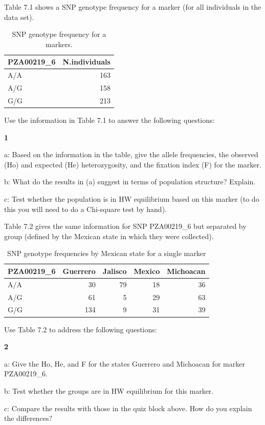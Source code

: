 \documentclass[
]{book}
\makeatletter
\newenvironment{kframe}{%
\medskip{}
\setlength{\fboxsep}{.8em}
 \def\at@end@of@kframe{}%
 \ifinner\ifhmode%
  \def\at@end@of@kframe{\end{minipage}}%
  \begin{minipage}{\columnwidth}%
 \fi\fi%
 \def\FrameCommand##1{\hskip\@totalleftmargin \hskip-\fboxsep
 \colorbox{shadecolor}{##1}\hskip-\fboxsep
     \hskip-\linewidth \hskip-\@totalleftmargin \hskip\columnwidth}%
 \MakeFramed {\advance\hsize-\width
   \@totalleftmargin\z@ \linewidth\hsize
   \@setminipage}}%
 {\par\unskip\endMakeFramed%
 \at@end@of@kframe}
\newenvironment{rmdblock}[1]
  {
  \begin{itemize}
  \renewcommand{\labelitemi}{
    \raisebox{-.7\height}[0pt][0pt]{
      {\setkeys{Gin}{width=3em,keepaspectratio}\texttt{[image: images/\#1]}}
    }
  }
  \setlength{\fboxsep}{1em}
  \begin{kframe}
  \item
  }
  {
  \end{kframe}
  \end{itemize}
  }
\newenvironment{rmdquiz}
  {\begin{rmdblock}{quiz}}
  {\end{rmdblock}}
\makeatother
\begin{document}
Table 7.1 shows a SNP genotype frequency for a marker (for all individuals in the data set).

\begin{table}

\caption{\label{tab:unnamed-chunk-269}SNP genotype frequency for a markers.}
\centering
\begin{tabular}[t]{lr}
\toprule
PZA00219\_6 & N.individuals\\
\midrule
A/A & 163\\
A/G & 158\\
G/G & 213\\
\bottomrule
\end{tabular}
\end{table}

Use the information in Table 7.1 to answer the following questions:

\begin{rmdquiz}
\textbf{1}

a: Based on the information in the table, give the allele frequencies, the observed (Ho) and expected (He) heterozygosity, and the fixation index (F) for the marker.

b: What do the results in (a) suggest in terms of population structure? Explain.

c: Test whether the population is in HW equilibrium based on this marker (to do this you will need to do a Chi-square test by hand).
\end{rmdquiz}

Table 7.2 gives the same information for SNP PZA00219\_6 but separated by group (defined by the Mexican state in which they were collected).

\begin{table}

\caption{\label{tab:unnamed-chunk-271}SNP genotype frequencies by Mexican state for a single marker}
\centering
\begin{tabular}[t]{lrrrr}
\toprule
PZA00219\_6 & Guerrero & Jalisco & Mexico & Michoacan\\
\midrule
A/A & 30 & 79 & 18 & 36\\
A/G & 61 & 5 & 29 & 63\\
G/G & 134 & 9 & 31 & 39\\
\bottomrule
\end{tabular}
\end{table}

Use Table 7.2 to address the following questions:

\begin{rmdquiz}
\textbf{2}

a: Give the Ho, He, and F for the states Guerrero and Michoacan for marker PZA00219\_6.

b: Test whether the groups are in HW equilibrium for this marker.

c: Compare the results with those in the quiz block above. How do you explain the differences?
\end{rmdquiz}
\end{document}

